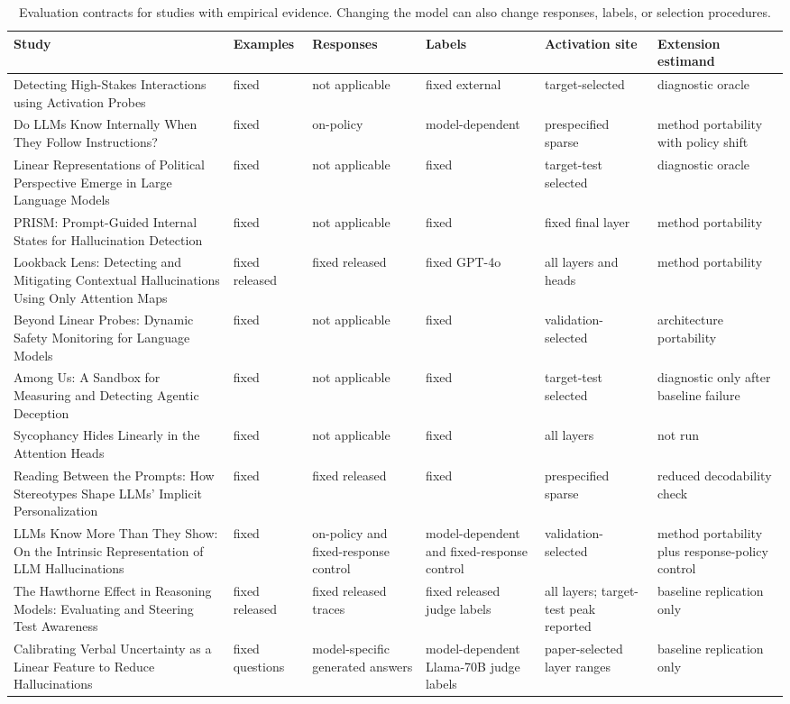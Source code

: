\begin{table}[t]
\centering
\scriptsize
\begin{tabularx}{\textwidth}{@{}p{}XXXXX@{}}
\toprule
Study & Examples & Responses & Labels & Activation site & Extension estimand \\
\midrule
Detecting High-Stakes Interactions using Activation Probes & fixed & not applicable & fixed external & target-selected & diagnostic oracle \\
Do LLMs Know Internally When They Follow Instructions? & fixed & on-policy & model-dependent & prespecified sparse & method portability with policy shift \\
Linear Representations of Political Perspective Emerge in Large Language Models & fixed & not applicable & fixed & target-test selected & diagnostic oracle \\
PRISM: Prompt-Guided Internal States for Hallucination Detection & fixed & not applicable & fixed & fixed final layer & method portability \\
Lookback Lens: Detecting and Mitigating Contextual Hallucinations Using Only Attention Maps & fixed released & fixed released & fixed GPT-4o & all layers and heads & method portability \\
Beyond Linear Probes: Dynamic Safety Monitoring for Language Models & fixed & not applicable & fixed & validation-selected & architecture portability \\
Among Us: A Sandbox for Measuring and Detecting Agentic Deception & fixed & not applicable & fixed & target-test selected & diagnostic only after baseline failure \\
Sycophancy Hides Linearly in the Attention Heads & fixed & not applicable & fixed & all layers & not run \\
Reading Between the Prompts: How Stereotypes Shape LLMs' Implicit Personalization & fixed & fixed released & fixed & prespecified sparse & reduced decodability check \\
LLMs Know More Than They Show: On the Intrinsic Representation of LLM Hallucinations & fixed & on-policy and fixed-response control & model-dependent and fixed-response control & validation-selected & method portability plus response-policy control \\
The Hawthorne Effect in Reasoning Models: Evaluating and Steering Test Awareness & fixed released & fixed released traces & fixed released judge labels & all layers; target-test peak reported & baseline replication only \\
Calibrating Verbal Uncertainty as a Linear Feature to Reduce Hallucinations & fixed questions & model-specific generated answers & model-dependent Llama-70B judge labels & paper-selected layer ranges & baseline replication only \\
\bottomrule
\end{tabularx}
\caption{Evaluation contracts for studies with empirical evidence. Changing the model can also change responses, labels, or selection procedures.}
\label{tab:evaluation-contracts}
\end{table}
